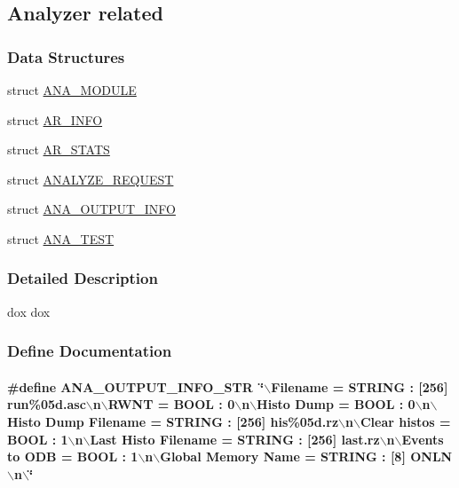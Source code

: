 \subsection{Analyzer related}
\label{group__manalyzer}
\subsubsection*{Data Structures}
\begin{DoxyCompactItemize}
\item 
struct \hyperlink{structANA__MODULE}{ANA\_\-MODULE}
\item 
struct \hyperlink{structAR__INFO}{AR\_\-INFO}
\item 
struct \hyperlink{structAR__STATS}{AR\_\-STATS}
\item 
struct \hyperlink{structANALYZE__REQUEST}{ANALYZE\_\-REQUEST}
\item 
struct \hyperlink{structANA__OUTPUT__INFO}{ANA\_\-OUTPUT\_\-INFO}
\item 
struct \hyperlink{structANA__TEST}{ANA\_\-TEST}
\end{DoxyCompactItemize}


\subsubsection{Detailed Description}
dox dox 

\subsubsection{Define Documentation}
\paragraph[{ANA\_\-OUTPUT\_\-INFO\_\-STR}]{\setlength{\rightskip}{0pt plus 5cm}\#define ANA\_\-OUTPUT\_\-INFO\_\-STR~\char`\"{}$\backslash$Filename = STRING : \mbox{[}256\mbox{]} run\%05d.asc$\backslash$n$\backslash$RWNT = BOOL : 0$\backslash$n$\backslash$Histo Dump = BOOL : 0$\backslash$n$\backslash$Histo Dump Filename = STRING : \mbox{[}256\mbox{]} his\%05d.rz$\backslash$n$\backslash$Clear histos = BOOL : 1$\backslash$n$\backslash$Last Histo Filename = STRING : \mbox{[}256\mbox{]} last.rz$\backslash$n$\backslash$Events to ODB = BOOL : 1$\backslash$n$\backslash$Global Memory Name = STRING : \mbox{[}8\mbox{]} ONLN$\backslash$n$\backslash$\char`\"{}}\hfill\label{group__manalyzer_ga34cf6f828e54cb4c285909cd3879adb8}


